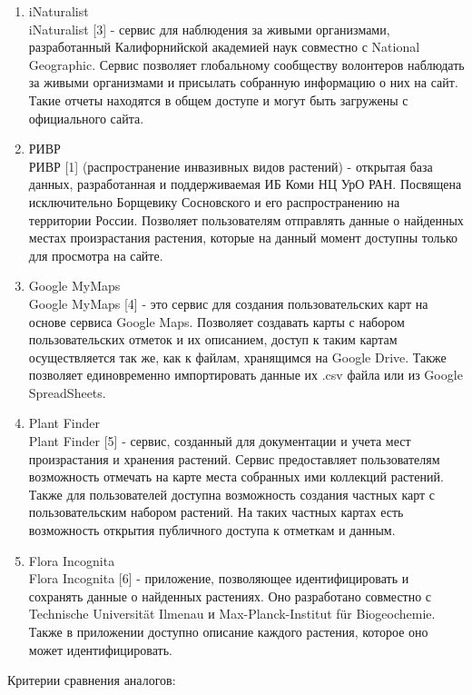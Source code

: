 \begin{enumerate}[topsep=0pt, parsep=0pt, itemsep=0pt, wide=0.5cm]
	\item iNaturalist \\
	iNaturalist [3] - сервис для наблюдения за живыми организмами, разработанный Калифорнийской академией наук совместно с National Geographic.
	Сервис позволяет глобальному сообществу волонтеров наблюдать за живыми организмами и присылать собранную информацию о них на сайт.
	Такие отчеты находятся в общем доступе и могут быть загружены с официального сайта.
	\item РИВР \\
	РИВР [1] (распространение инвазивных видов растений) - открытая база данных, разработанная и поддерживаемая ИБ Коми НЦ УрО РАН.
	Посвящена исключительно Борщевику Сосновского и его распространению на территории России.
	Позволяет пользователям отправлять данные о найденных местах произрастания растения, которые на данный момент доступны только для просмотра на сайте.
	\item Google MyMaps \\
	Google MyMaps [4] - это сервис для создания пользовательских карт на основе сервиса Google Maps.
	Позволяет создавать карты с набором пользовательских отметок и их описанием, доступ к таким картам осуществляется так же, как к файлам, хранящимся на Google Drive.
	Также позволяет единовременно импортировать данные их .csv файла или из Google SpreadSheets.
	\item Plant Finder \\
	Plant Finder [5] - сервис, созданный для документации и
	учета мест произрастания и хранения растений. Сервис
	предоставляет пользователям возможность отмечать на
	карте места собранных ими коллекций растений. Также
	для пользователей доступна возможность создания
	частных карт с пользовательским набором растений. На
	таких частных картах есть возможность открытия
	публичного доступа к отметкам и данным.
	\item Flora Incognita \\
	Flora Incognita [6] - приложение, позволяющее
	идентифицировать и сохранять данные о найденных
	растениях. Оно разработано совместно с Technische
	Universität Ilmenau и Max-Planck-Institut für Biogeochemie.
	Также в приложении доступно описание каждого
	растения, которое оно может идентифицировать.
\end{enumerate}

\nwln
Критерии сравнения аналогов:

